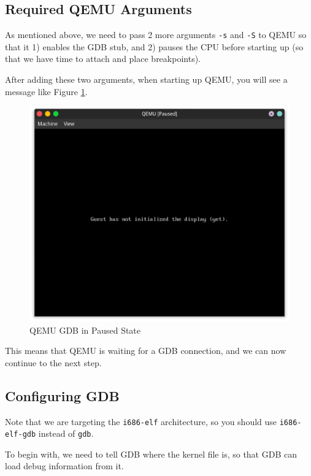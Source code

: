 \subsection{Required QEMU Arguments} \label{sec:qemu-args}

As mentioned above, we need to pass 2 more arguments \texttt{-s} and \texttt{-S} to QEMU so that it
1) enables the GDB stub, and 2) pauses the CPU before starting up (so that we have time to attach and
place breakpoints).

After adding these two arguments, when starting up QEMU, you will see a message like Figure \ref{fig:qemu-gdb-paused}.

\begin{figure}[h]
    \centering
    \includegraphics[width=\textwidth]{assets/c1.mos-qemu-gdb-paused.png}
    \caption{QEMU GDB in Paused State}
    \label{fig:qemu-gdb-paused}
\end{figure}

This means that QEMU is waiting for a GDB connection, and we can now continue to the next step.

\subsection{Configuring GDB} \label{sec:gdb-config}

Note that we are targeting the \texttt{i686-elf} architecture, so you should use \texttt{i686-elf-gdb}
instead of \texttt{gdb}.

To begin with, we need to tell GDB where the kernel file is, so that GDB can load debug information
from it.

